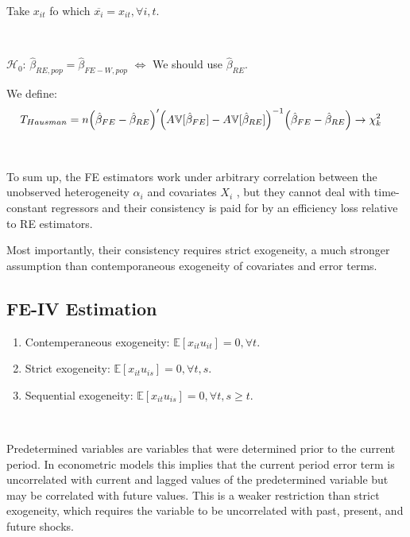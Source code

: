 Take $x_{it} $ fo which $\overline{x_i} = x_{it}, \forall i, t.$

\begin{theorem}\label{Hausman-test}
    \
    
    $\mathcal{H}_0$: $\hat{\beta}_{RE, pop} = \hat{\beta}_{FE-W, pop}$ $\Leftrightarrow$ We should use $\hat{\beta}_{RE}$.

    We define:
    \begin{align*}
        T_{Hausman} &= n \Bigl(\hat{\beta}_{FE} - \hat{\beta}_{RE} \Bigr)^{\prime} \Bigl( A\mathbb{V}[\hat{\beta}_{FE}] - A\mathbb{V}[\hat{\beta}_{RE}] \Bigr)^{-1} \Bigl(\hat{\beta}_{FE} - \hat{\beta}_{RE}\Bigr) \rightarrow \chi_k^2
    \end{align*}
\end{theorem}

\begin{note}
    \

    To sum up, the FE estimators work under arbitrary correlation between the unobserved
heterogeneity $\alpha_i$ and covariates $X_i$ , but they cannot deal with time-constant regressors and
their consistency is paid for by an efficiency loss relative to RE estimators.

    Most importantly, their consistency requires strict exogeneity, 
    a much stronger assumption than contemporaneous exogeneity of covariates and error terms.
\end{note}

\subsection{FE-IV Estimation}

\begin{enumerate}
    \item Contemperaneous exogeneity: $\mathbb{E}[x_{it} u_{it}] = 0, \forall t.$
    \item Strict exogeneity: $\mathbb{E}[x_{it} u_{is}] = 0, \forall t, s.$
    \item Sequential exogeneity: $\mathbb{E}[x_{it} u_{is}] = 0, \forall t, s \geq t.$
\end{enumerate}
\begin{definition}
    \

    Predetermined variables are variables that were determined prior to the current period. 
    In econometric models this implies that the current period error term is 
    uncorrelated with current and lagged values of the predetermined variable 
    but may be correlated with future values. 
    This is a weaker restriction than strict exogeneity, 
    which requires the variable to be uncorrelated with past, present, and future shocks.
\end{definition}

